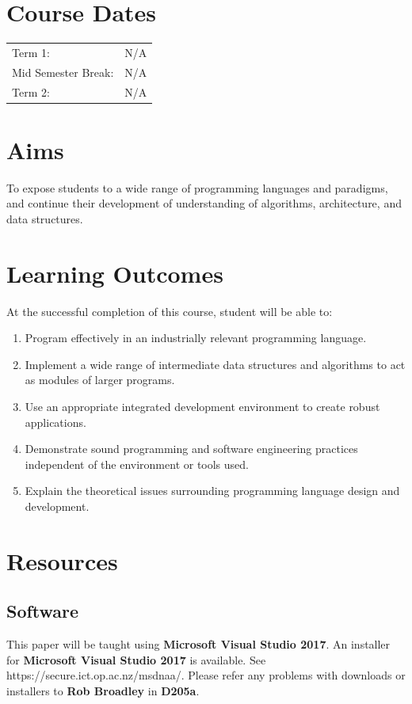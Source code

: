 \documentclass{article}
\begin{document}
\section*{Course Dates}
\begin{tabular}{ll}
  Term 1:             & N/A \\
  Mid Semester Break: & N/A \\
  Term 2:             & N/A \\
\end{tabular}

\section*{Aims}
To expose students to a wide range of programming languages and paradigms, and continue their development of understanding of algorithms, architecture, and data structures.

\section*{Learning Outcomes}
At the successful completion of this course, student will be able to:
\begin{enumerate}
    \item Program effectively in an industrially relevant programming language.
    \item Implement a wide range of intermediate data structures and algorithms to act as
    modules of larger programs.
    \item Use an appropriate integrated development environment to create robust applications.
    \item Demonstrate sound programming and software engineering practices independent of the environment or tools used.
    \item Explain the theoretical issues surrounding programming language design and development.
  \end{enumerate}

\section*{Resources}

\subsection*{Software}
This paper will be taught using \textbf{Microsoft Visual Studio 2017}. An installer for \textbf{Microsoft Visual Studio 2017} is available. See https://secure.ict.op.ac.nz/msdnaa/. Please refer any problems with downloads or installers to \textbf{Rob Broadley} in \textbf{D205a}.
\end{document}
